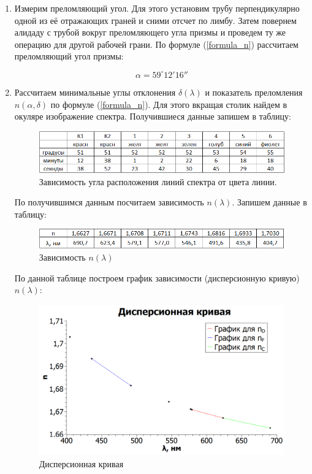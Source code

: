 \documentclass[a4paper, 12pt]{article}%
\begin{document}
\begin{enumerate}

\item Измерим преломляющий угол. Для этого установим трубу перпендикулярно одной из её отражающих граней и сними отсчет по лимбу. Затем повернем алидаду с трубой вокруг преломляющего угла призмы и проведем ту же операцию для другой рабочей грани.
По формуле (\ref{formula_n}) рассчитаем преломляющий угол призмы:

\[\alpha = 59^{\circ}12'16''\]

\item Рассчитаем минимальные углы отклонения $\delta (\lambda )$ и показатель преломления $n (\alpha, \delta)$ по формуле (\ref{formula_n}). Для этого вкращая столик найдем в окуляре изображение спектра. Получившиеся данные запишем в таблицу:

\begin{figure}[h!]
\centering
\includegraphics[scale=1]{images/table_1.png}
\caption{Зависимость угла расположения линий спектра от цвета линии.}
\label{fig:table_1}
\end{figure}

По получившимся данным посчитаем зависимость $n(\lambda )$. Запишем данные в таблицу:

\begin{figure}[h!]
\centering
\includegraphics[scale=1]{images/table_2.png}
\caption{Зависимость $n(\lambda )$}
\label{fig:table_2}
\end{figure}

По данной таблице построем график зависимости (дисперсионную кривую) $n(\lambda)$:

\begin{figure}[h!]
\centering
\includegraphics[scale=0.8]{images/graph_1.png}
\caption{Дисперсионная кривая}
\label{fig:graph_1}
\end{figure}


\end{enumerate}
\end{document}
